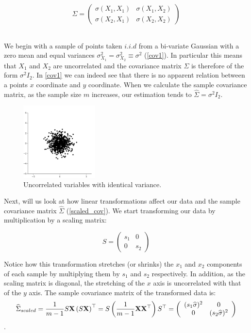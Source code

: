 $$\Sigma = \left( \begin{array}{ccc}  \sigma\left(X_1, X_1\right) & \sigma\left(X_1, X_2\right) \\  \sigma\left(X_2, X_1\right) & \sigma\left(X_2, X_2\right) \end{array} \right)$$

~\\We begin with a sample of points taken $i.i.d$ from a bi-variate Gaussian with a zero mean and equal variances $\sigma^2_{X_1}=\sigma^2_{X_2}\equiv  \sigma^2$ (\autoref{cov1}). In particular this means that $X_1$ and $X_2$ are uncorrelated and the covariance matrix $\Sigma$ is therefore of the form $\sigma^2 I_2$. In \autoref{cov1} we can indeed see that there is no apparent relation between a points $x$ coordinate and $y$ coordinate. When we calculate the sample covariance matrix, as the sample size $m$ increases, our estimation tends to $\widehat{\Sigma}=\sigma^2 I_2$.

\begin{figure}[H]
	\centering
	\includegraphics[width=0.35\textwidth]{chapters/mathematical.basis/figures/cov.png}
	\caption{Uncorrelated variables with identical variance. \GitChapterOneExamples}
	\label{cov1}
\end{figure}

Next, will us look at how linear transformations affect our data and the sample covariance matrix $\widehat{\Sigma}$ (\autoref{scaled_cov}). We start transforming our data by multiplication by a scaling matrix:

$$S = \left( \begin{array}{ccc}  s_{1} & 0 \\  0 & s_{2} \end{array} \right)$$

Notice how this transformation stretches (or shrinks) the $x_1$ and $x_2$ components of each sample by multiplying them by $s_{1}$ and $s_{2}$ respectively. In addition, as the scaling matrix is diagonal, the stretching of the $x$ axis is uncorrelated with that of the $y$ axis. The sample covariance matrix of the transformed data is:
$$\widehat{\Sigma}_{scaled}=\frac{1}{m-1}S\mathbf{X}\left(S\mathbf{X}\right)^\top=S\left(\frac{1}{m-1}\mathbf{X}\mathbf{X}^\top\right)S^\top=\left( \begin{array}{ccc}  (s_{1}\widehat{\sigma})^2 & 0 \\  0 & (s_{2}\widehat{\sigma})^2 \end{array} \right)$$.

